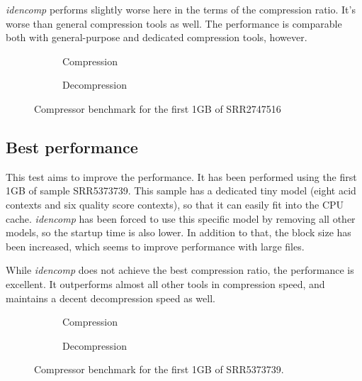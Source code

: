 \emph{idencomp} performs slightly worse here in the terms of the compression
ratio.
It's worse than general compression tools as well.
The performance is comparable both with general-purpose and dedicated
compression tools, however.

\begin{figure}[h]
    \begin{subfigure}{\textwidth}
        \centering
        
        \caption{Compression}
    \end{subfigure}
    \begin{subfigure}{\textwidth}
        \centering
        \vspace{1em}
        
        \caption{Decompression}
    \end{subfigure}
    \caption{%
        Compressor benchmark for the first 1GB of SRR2747516
    }
    \label{fig:bench-known-sequencing}
\end{figure}

\newpage

\subsection{Best performance}\label{subsec:best-performance}

This test aims to improve the performance.
It has been performed using the first 1GB of sample SRR5373739.
This sample has a dedicated tiny model (eight acid contexts and six quality
score contexts), so that it can easily fit into the CPU cache.
\emph{idencomp} has been forced to use this specific model by removing all
other models, so the startup time is also lower.
In addition to that, the block size has been increased, which seems to
improve performance with large files.

While \emph{idencomp} does not achieve the best compression ratio, the
performance is excellent.
It outperforms almost all other tools in compression speed, and maintains a
decent decompression speed as well.

\begin{figure}[h]
    \begin{subfigure}{\textwidth}
        \centering
        
        \caption{Compression}
    \end{subfigure}
    \begin{subfigure}{\textwidth}
        \centering
        \vspace{1em}
        
        \caption{Decompression}
    \end{subfigure}
    \caption{%
        Compressor benchmark for the first 1GB of SRR5373739.
    }
    \label{fig:bench-best-performance}
\end{figure}

